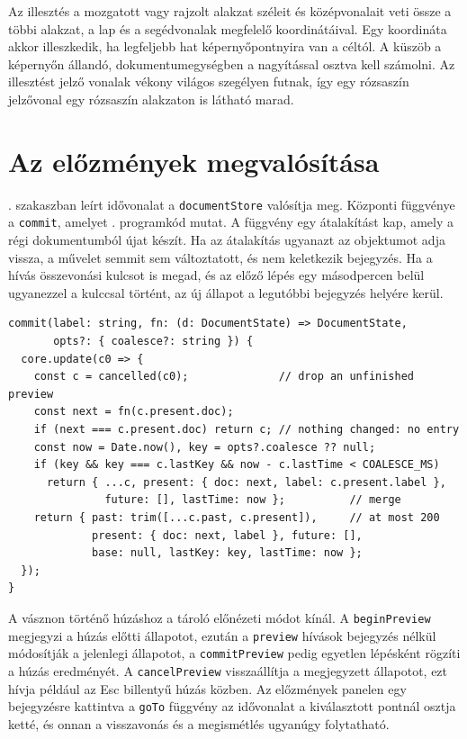 Az illesztés a mozgatott vagy rajzolt alakzat széleit és középvonalait veti össze a többi alakzat, a lap és a segédvonalak megfelelő koordinátáival. Egy koordináta akkor illeszkedik, ha legfeljebb hat képernyőpontnyira van a céltól. A küszöb a képernyőn állandó, dokumentumegységben a nagyítással osztva kell számolni. Az illesztést jelző vonalak vékony világos szegélyen futnak, így egy rózsaszín jelzővonal egy rózsaszín alakzaton is látható marad.

\section{Az előzmények megvalósítása}
\label{sec:history_impl}

. szakaszban leírt idővonalat a \texttt{documentStore} valósítja meg. Központi függvénye a \texttt{commit}, amelyet . programkód mutat. A függvény egy átalakítást kap, amely a régi dokumentumból újat készít. Ha az átalakítás ugyanazt az objektumot adja vissza, a művelet semmit sem változtatott, és nem keletkezik bejegyzés. Ha a hívás összevonási kulcsot is megad, és az előző lépés egy másodpercen belül ugyanezzel a kulccsal történt, az új állapot a legutóbbi bejegyzés helyére kerül.

\begin{lstlisting}[style=TS, caption={Egy visszavonható lépés rögzítése (\texttt{stores/document.ts}, rövidítve)}, label=lst:commit]
commit(label: string, fn: (d: DocumentState) => DocumentState,
       opts?: { coalesce?: string }) {
  core.update(c0 => {
    const c = cancelled(c0);              // drop an unfinished preview
    const next = fn(c.present.doc);
    if (next === c.present.doc) return c; // nothing changed: no entry
    const now = Date.now(), key = opts?.coalesce ?? null;
    if (key && key === c.lastKey && now - c.lastTime < COALESCE_MS)
      return { ...c, present: { doc: next, label: c.present.label },
               future: [], lastTime: now };          // merge
    return { past: trim([...c.past, c.present]),     // at most 200
             present: { doc: next, label }, future: [],
             base: null, lastKey: key, lastTime: now };
  });
}
\end{lstlisting}

A vásznon történő húzáshoz a tároló előnézeti módot kínál. A \texttt{beginPreview} megjegyzi a húzás előtti állapotot, ezután a \texttt{preview} hívások bejegyzés nélkül módosítják a jelenlegi állapotot, a \texttt{commitPreview} pedig egyetlen lépésként rögzíti a húzás eredményét. A \texttt{cancelPreview} visszaállítja a megjegyzett állapotot, ezt hívja például az Esc billentyű húzás közben. Az előzmények panelen egy bejegyzésre kattintva a \texttt{goTo} függvény az idővonalat a kiválasztott pontnál osztja ketté, és onnan a visszavonás és a megismétlés ugyanúgy folytatható.

